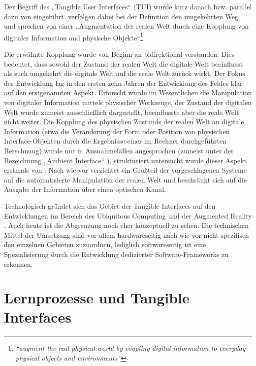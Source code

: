 Der Begriff des „Tangible User Interfaces“ (TUI) wurde kurz danach bzw. parallel dazu von \citet{Ishii97} eingeführt. \citeauthor{Ishii97} verfolgen dabei bei der Definition den umgekehrten Weg und sprechen von einer „Augmentation der realen Welt durch eine Kopplung von digitaler Information and physische Objekte“\footnote{\emph{“augment the real physical world by coupling digital information to everyday physical objects and environments”}\citep{Ishii97}}. 

Die erwähnte Kopplung wurde von Beginn an bidirektional verstanden. Dies bedeutet, dass sowohl der Zustand der realen Welt die digitale Welt beeinflusst als such umgekehrt die digitale Welt auf die reale Welt zurück wirkt. Der Fokus der Entwicklung lag in den ersten zehn Jahren der Entwicklung des Feldes klar auf den erstgenannten Aspekt. Erforscht wurde im Wesentlichen die Manipulation von digitaler Information mittels physischer Werkzeuge, der Zustand der digitalen Welt wurde zumeist ausschließlich dargestellt, beeinflusste aber die reale Welt nicht weiter. Die Kopplung des physischen Zustands der realen Welt an digitale Information (etwa die Veränderung der Form oder Position von physischen Interface-Objekten durch die Ergebnisse einer im Rechner durchgeführten Berechnung) wurde nur in Ausnahmefällen angesprochen (zumeist unter der Bezeichnung „Ambient Interface“ \citep{Gross03}), strukturiert untersucht wurde dieser Aspekt erstmals von \citet{Patten07}. Nach wie vor verzichtet ein Großteil der vorgeschlagenen Systeme auf die automatisierte Manipulation der realen Welt und beschränkt sich auf die Ausgabe der Information über einen optischen Kanal.

Technologisch gründet sich das Gebiet der Tangible Interfaces auf den Entwicklungen im Bereich des Ubiquitous Computing \citep{Weiser91} und der Augmented Reality \citep{Azuma97}. Auch heute ist die Abgrenzung noch eher konzeptuell zu sehen. Die technischen Mittel der Umsetzung sind vor allem hardwareseitig nach wie vor nicht spezifisch den einzelnen Gebieten zuzuordnen, lediglich softwareseitig ist eine Spezialisierung durch die Entwicklung dedizierter Software-Frameworks zu erkennen.

\section{Lernprozesse und Tangible Interfaces} %
\label{sec:lernprozesse_und_tangible_interface}

